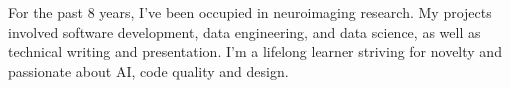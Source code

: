 \begin{cventries}
    \begin{flushleft}
        \bodyfont
        For the past 8 years, I've been occupied in neuroimaging research.
        My projects involved software development, data engineering,
        and data science, as well as technical writing and presentation.
        I'm a lifelong learner striving for novelty
        and passionate about AI, code quality and design.
    \end{flushleft}
\end{cventries}
